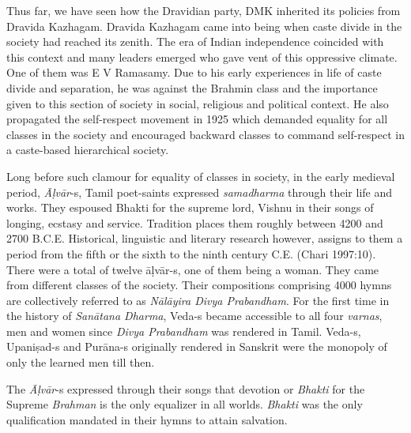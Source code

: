 Thus far, we have seen how the Dravidian party, DMK inherited its policies from Dravida Kazhagam. Dravida Kazhagam came into being when caste divide in the society had reached its zenith. The era of Indian independence coincided with this context and many leaders emerged who gave vent of this oppressive climate. One of them was E V Ramasamy. Due to his early experiences in life of caste divide and separation, he was against the Brahmin class and the importance given to this section of society in social, religious and political context. He also propagated the self-respect movement in 1925 which demanded equality for all classes in the society and encouraged backward classes to command self-respect in a caste-based hierarchical society.

Long before such clamour for equality of classes in society, in the early medieval period, \textit{Āḷvār}-s, Tamil poet-saints expressed \textit{samadharma} through their life and works. They espoused Bhakti for the supreme lord, Vishnu in their songs of longing, ecstasy and service. Tradition places them roughly between 4200 and 2700 B.C.E. Historical, linguistic and literary research however, assigns to them a period from the fifth or the sixth to the ninth century C.E. (Chari 1997:10). There were a total of twelve āḷvār-s, one of them being a woman. They came from different classes of the society. Their compositions comprising 4000 hymns are collectively referred to as \textit{Nālāyira Divya Prabandham}. For the first time in the history of \textit{Sanātana Dharma}, Veda-s became accessible to all four \textit{varnas}, men and women since \textit{Divya Prabandham }was rendered in Tamil. Veda-s, Upaniṣad-s and Purāna-s originally rendered in Sanskrit were the monopoly of only the learned men till then.

The \textit{Āḷvār}-s expressed through their songs that devotion or\textit{ Bhakti} for the Supreme \textit{Brahman} is the only equalizer in all worlds. \textit{Bhakti }was the only qualification mandated in their hymns to attain salvation.

